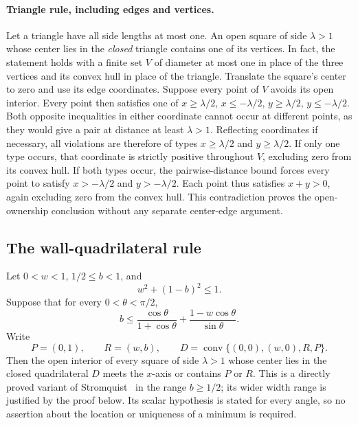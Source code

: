 \documentclass[11pt]{article}
\begin{document}
\paragraph{Triangle rule, including edges and vertices.}
Let a triangle have all side lengths at most one. An open square of
side $\lambda>1$ whose center lies in the \emph{closed} triangle
contains one of its vertices. In fact, the statement holds with a finite
set $V$ of diameter at most one in place of the three vertices and its
convex hull in place of the triangle.
Translate the square's center to zero and use its edge coordinates.
Suppose every point of $V$ avoids its open interior. Every point then
satisfies one of $x\ge\lambda/2$, $x\le-\lambda/2$,
$y\ge\lambda/2$, $y\le-\lambda/2$. Both opposite inequalities in either
coordinate cannot occur at different points, as they would give a pair
at distance at least $\lambda>1$. Reflecting coordinates if necessary,
all violations are therefore of types $x\ge\lambda/2$ and
$y\ge\lambda/2$.
If only one type occurs, that coordinate is strictly positive throughout
$V$, excluding zero from its convex hull. If both types occur, the
pairwise-distance bound forces every point to satisfy
$x> -\lambda/2$ and $y> -\lambda/2$. Each point thus satisfies $x+y>0$,
again excluding zero from the convex hull. This contradiction proves the
open-ownership conclusion without any separate center-edge argument.

\subsection{The wall-quadrilateral rule}
Let $0<w<1$, $1/2\le b<1$, and
\[
 w^2+(1-b)^2\le1.
\]
Suppose that for every $0<\theta<\pi/2$,
\begin{equation}\label{eq:independent-wall-hypothesis}
 b\le \frac{\cos\theta}{1+\cos\theta}
       +\frac{1-w\cos\theta}{\sin\theta}.
\end{equation}
Write
\[
 P=(0,1),\qquad R=(w,b),\qquad
 D=\operatorname{conv}\{(0,0),(w,0),R,P\}.
\]
Then the open interior of every square of side $\lambda>1$ whose center
lies in the closed quadrilateral $D$ meets the $x$-axis or contains $P$ or
$R$. This is a directly proved variant of Stromquist\textup{~\cite[Lemma~4, pp.~3--4]{stromquist}} in the range $b\ge1/2$; its wider width range is justified by the proof below. Its scalar hypothesis is stated for every angle, so no assertion about the location or uniqueness of a minimum is required.
\end{document}
